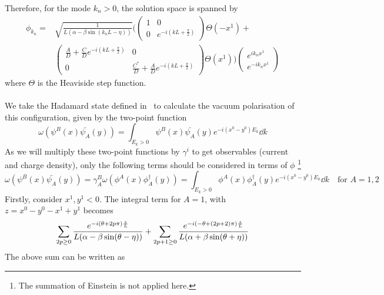 Therefore, for the mode $k_n > 0$, the solution space is spanned by 
\begin{equation}
\begin{split}
\phi_{k_{n}} = 
& \sqrt{\frac{1}{L(\alpha - \beta \sin (k_{n}L - \eta))}} \Bigg( 
\begin{pmatrix}
1 & 0 \\
0  & e^{-i(kL + \frac{\pi}{2})}
\end{pmatrix}
\Theta(-x^1) + \\
& \begin{pmatrix}
\frac{A}{D}  +  \frac{C}{D} e^{-i(kL + \frac{\pi}{2})} & 0 \\
0  & \frac{C^*}{D}  + \frac{A}{D}e^{-i(kL + \frac{\pi}{2})}
\end{pmatrix}\Theta(x^1)\Bigg)
\begin{pmatrix}
e^{ik_{n} x^1} \\
e^{- ik_{n} x^1}
\end{pmatrix}
\end{split}
\end{equation}
where $\Theta$ is the Heaviside step function.\\\\
We take the Hadamard state defined in~\cite{Zahn2015} to calculate the vacuum polarisation of this configuration, given by the two-point function
\begin{equation}
\omega(\psi^B(x) \bar{\psi_A}(y)) = \int_{E_k > 0} \psi^B(x) \bar{\psi_A}(y) e^{-i(x^0 - y^0) E_k} \dd k
\end{equation}
As we will multiply these two-point functions by $\gamma^i$ to get observables (current and charge density), only the following terms should be considered in terms of $\phi$ \footnote{
The summation of Einstein is not applied here.}
\begin{equation}
\omega(\psi^B(x) \bar{\psi_A}(y)) = 
\gamma^B_A \omega(\phi^A(x) \phi^\dagger_A(y)) = 
\int_{E_k > 0} \phi^A(x) \phi^\dagger_A(y) e^{-i(x^0 - y^0) E_k} \dd k
\quad \textrm{for $A = 1,2$}
\end{equation}
Firstly, consider $x^1, y^1 < 0$. The integral term for $A =1$, with $z =x^0 - y^0 - x^1 +y^1$ becomes
\begin{equation}
\sum_{2p \geq 0} \frac{e^{-i(\theta + 2p\pi)\frac{z}{L}}}{L(\alpha - \beta \sin (\theta - \eta))} 
+ \sum_{2p+1 \geq 0} \frac{e^{-i(- \theta + (2p+2)\pi)\frac{z}{L}}}{L(\alpha + \beta \sin (\theta + \eta))}\\
\end{equation}
The above sum can be written as
